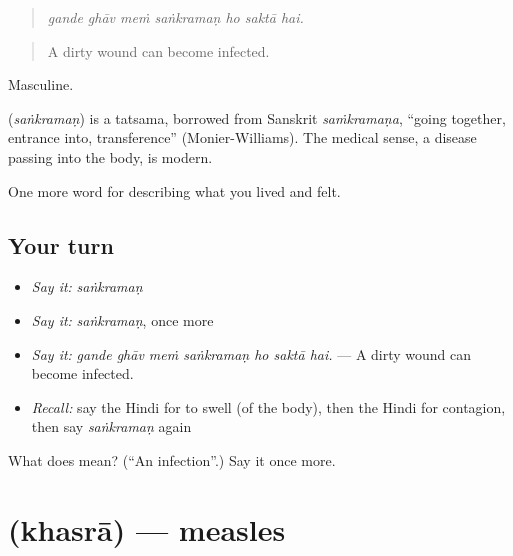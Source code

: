 \begin{quote}
      
\end{quote}

\begin{quote}
\emph{gande ghāv meṁ saṅkramaṇ ho saktā hai.}
\end{quote}

\begin{quote}
A dirty wound can become infected.
\end{quote}

Masculine.

\begin{cousinweb}
\textbf{} (\emph{saṅkramaṇ}) is a tatsama, borrowed from Sanskrit \emph{saṁkramaṇa}, \textquotedblleft{}going together, entrance into, transference\textquotedblright{} (Monier-Williams). The medical sense, a disease passing into the body, is modern.
\end{cousinweb}

\begin{grammarlens}[title={What you've built}]
One more word for describing what you lived and felt.
\end{grammarlens}

\subsection*{Your turn}
\begin{itemize}
\raggedright
  \item \emph{Say it:} \emph{saṅkramaṇ}
  \item \emph{Say it:} \emph{saṅkramaṇ}, once more
  \item \emph{Say it:} \emph{gande ghāv meṁ saṅkramaṇ ho saktā hai.} — A dirty wound can become infected.
  \item \emph{Recall:} say the Hindi for to swell (of the body), then the Hindi for contagion, then say \emph{saṅkramaṇ} again
\end{itemize}

\begin{tcolorbox}[breakable,colback=teal!4,colframe=teal!35!black,title={Before you move on}]
What does  mean? (\textquotedblleft{}An infection\textquotedblright{}.) Say it once more.
\end{tcolorbox}
\section[\texorpdfstring{\hi{खसरा} (khasrā)}{खसरा (khasrā)}]{ (khasrā) — measles}

